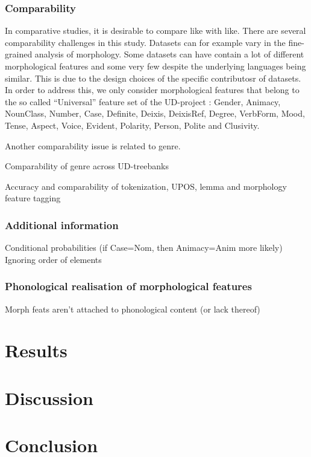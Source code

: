 \documentclass[a4paper]{article}
\begin{document}
\subsubsection{Comparability}
In comparative studies, it is desirable to compare like with like. There are several comparability challenges in this study. 
Datasets can for example vary in the fine-grained analysis of morphology. 
Some datasets can have contain a lot of different morphological features and some very few despite the underlying languages being similar. 
This is due to the design choices of the specific contributosr of datasets. 
In order to address this, we only consider morphological features that belong to the so called ``Universal'' feature set of the UD-project \citep{ud_2_feat_website}: Gender, Animacy, NounClass, Number, Case, Definite, Deixis, DeixisRef, Degree, VerbForm, Mood, Tense, Aspect, Voice, Evident, Polarity, Person, Polite and Clusivity.

Another comparability issue is related to genre. 

Comparability of genre across UD-treebanks

Accuracy and comparability of tokenization, UPOS, lemma and morphology feature tagging

\subsubsection{Additional information}
Conditional probabilities (if Case=Nom, then Animacy=Anim more likely)
Ignoring order of elements

\subsubsection{Phonological realisation of morphological features}
Morph feats aren't attached to phonological content (or lack thereof)




\section{Results}

\section{Discussion}

\section{Conclusion}





	
\end{document}
